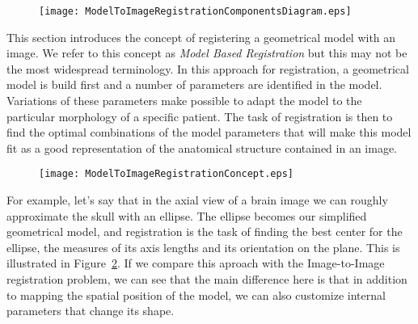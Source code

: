 %
%
%
%
%
%

\begin{figure}
\center
\texttt{[image: ModelToImageRegistrationComponentsDiagram.eps]}
\label{fig:ModelToImageRegistrationComponentsDiagram}
\end{figure}


This section introduces the concept of registering a geometrical model with an
image. We refer to this concept as \emph{Model Based Registration} but this may
not be the most widespread terminology. In this approach for registration, a
geometrical model is build first and a number of parameters are identified in
the model. Variations of these parameters make possible to adapt the model to
the particular morphology of a specific patient. The task of registration is
then to find the optimal combinations of the model parameters that will make
this model fit as a good representation of the anatomical structure contained
in an image. 


\begin{figure}
\center
\texttt{[image: ModelToImageRegistrationConcept.eps]}
\label{fig:ModelToImageRegistrationConcept}
\end{figure}


For example, let's say that in the axial view of a brain image we can roughly
approximate the skull with an ellipse. The ellipse becomes our simplified
geometrical model, and registration is the task of finding the best center for
the ellipse, the measures of its axis lengths and its orientation on the plane.
This is illustrated in Figure~\ref{fig:ModelToImageRegistrationConcept}.  If we
compare this aproach with the Image-to-Image registration problem, we can see
that the main difference here is that in addition to mapping the spatial
position of the model, we can also customize internal parameters that change
its shape.

